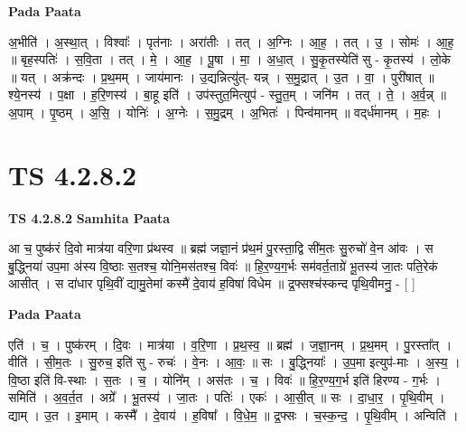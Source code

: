 \documentclass[17pt]{extarticle}
\begin{document}
\textbf{Pada Paata} \newline

अ॒भीति॑ । अ॒स्था॒त् । विश्वाः᳚ । पृत॑नाः । अरा॑तीः । तत् । अ॒ग्निः । आ॒ह॒ । तत् । उ॒ । सोमः॑ । आ॒ह॒ ॥ बृह॒स्पतिः॑ । स॒वि॒ता । तत् । मे॒ । आ॒ह॒ । पू॒षा । मा॒ । अ॒धा॒त् । सु॒कृ॒तस्येति॑ सु - कृ॒तस्य॑ । लो॒के ॥ यत् । अक्र॑न्दः । प्र॒थ॒मम् । जाय॑मानः । उ॒द्यन्नित्यु॑त्- यन्न् । स॒मु॒द्रात् । उ॒त । वा॒ । पुरी॑षात् ॥ श्ये॒नस्य॑ । प॒क्षा । ह॒रि॒णस्य॑ । बा॒हू इति॑ । उप॑स्तुत॒मित्युप॑ - स्तु॒त॒म् । जनि॑म । तत् । ते॒ । अ॒र्व॒न्न् ॥ अ॒पाम् । पृ॒ष्ठम् । अ॒सि॒ । योनिः॑ । अ॒ग्नेः । स॒मु॒द्रम् । अ॒भितः॑ । पिन्व॑मानम् ॥ वद्‌र्ध॑मानम् । म॒हः ।  \newline





\section{ TS 4.2.8.2 }

\textbf{TS 4.2.8.2 } \newline
\textbf{Samhita Paata} \newline

आ च॒ पुष्क॑रं दि॒वो मात्र॑या वरि॒णा प्र॑थस्व ॥ ब्रह्म॑ जज्ञा॒नं प्र॑थ॒मं पु॒रस्ता॒द्वि सी॑म॒तः सु॒रुचो॑ वे॒न आ॑वः । स बु॒द्ध्निया॑ उप॒मा अ॑स्य वि॒ष्ठाः स॒तश्च॒ योनि॒मस॑तश्च॒ विवः॑ ॥ हि॒र॒ण्य॒ग॒र्भः सम॑वर्त॒ताग्रे॑ भू॒तस्य॑ जा॒तः पति॒रेक॑ आसीत् । स दा॑धार पृथि॒वीं द्यामु॒तेमां कस्मै॑ दे॒वाय॑ ह॒विषा॑ विधेम ॥ द्र॒फ्सश्च॑स्कन्द पृथि॒वीमनु॒ - [  ] \newline

\textbf{Pada Paata} \newline

एति॑ । च॒ । पुष्क॑रम् । दि॒वः । मात्र॑या । व॒रि॒णा । प्र॒थ॒स्व॒ ॥ ब्रह्म॑ । ज॒ज्ञा॒नम् । प्र॒थ॒मम् । पु॒रस्ता᳚त् । वीति॑ । सी॒म॒तः । सु॒रुच॒ इति॑ सु - रुचः॑ । वे॒नः । आ॒वः॒ ॥ सः । बु॒द्ध्नियाः᳚ । उ॒प॒मा इत्युप॑-माः । अ॒स्य॒ । वि॒ष्ठा इति॑ वि-स्थाः । स॒तः । च॒ । योनि᳚म् । अस॑तः । च॒ । विवः॑ ॥ हि॒र॒ण्य॒ग॒र्भ इति॑ हिरण्य - ग॒र्भः । समिति॑ । अ॒व॒र्त॒त । अग्रे᳚ । भू॒तस्य॑ । जा॒तः । पतिः॑ । एकः॑ । आ॒सी॒त् ॥ सः । दा॒धा॒र॒ । पृ॒थि॒वीम् । द्याम् । उ॒त । इ॒माम् । कस्मै᳚ । दे॒वाय॑ । ह॒विषा᳚ । वि॒धे॒म॒ ॥ द्र॒फ्सः । च॒स्क॒न्द॒ । पृ॒थि॒वीम् । अन्विति॑ ।  \newline




\end{document}
